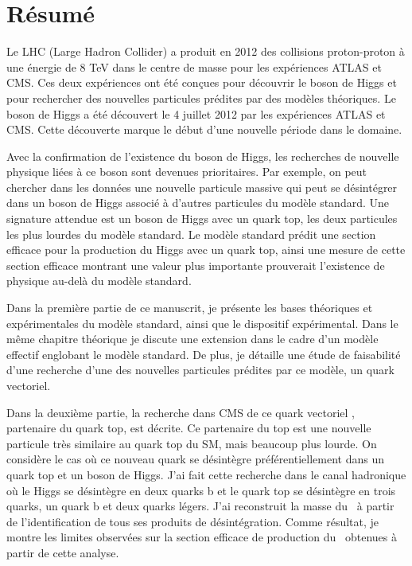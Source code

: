 \begin{otherlanguage}{francais}
\chapter*{R\'{e}sum\'{e}}

Le LHC (Large Hadron Collider) a produit en 2012 des collisions proton-proton à une énergie de 8 TeV  dans le centre de masse pour les expériences ATLAS et CMS. Ces deux expériences ont été conçues pour découvrir le boson de Higgs et pour rechercher des nouvelles particules prédites par des modèles théoriques. Le boson de Higgs a été découvert le 4 juillet 2012 par les expériences ATLAS et CMS. Cette découverte marque le début  d'une nouvelle période dans le domaine. 

Avec la confirmation de l'existence du boson de Higgs, les recherches de nouvelle physique liées à ce boson sont devenues prioritaires. Par exemple, on peut chercher dans les données une nouvelle particule massive qui peut se désintégrer dans un boson de Higgs associé à d'autres particules du modèle standard. Une signature attendue est un boson de Higgs avec un quark top, les deux particules les plus lourdes du modèle standard. Le modèle standard prédit une section efficace pour la production du Higgs avec un quark top, ainsi une mesure de cette section efficace montrant une valeur plus importante prouverait l'existence de physique au-delà du modèle standard.

Dans la première partie de ce manuscrit, je présente les bases théoriques et expérimentales du modèle standard, ainsi que le dispositif expérimental. Dans le même chapitre théorique je discute une extension dans le cadre d'un modèle effectif englobant le modèle standard. De plus, je détaille une étude de faisabilité d'une recherche d'une des nouvelles particules prédites par ce modèle, un quark vectoriel.

Dans la deuxième partie, la recherche dans CMS de ce quark vectoriel \Tp,  partenaire du quark top, est décrite. Ce partenaire du top est une nouvelle particule très similaire au quark top du SM, mais beaucoup plus lourde. On considère le cas où ce nouveau quark se désintègre préférentiellement dans un quark top et un boson de Higgs. J'ai fait cette recherche dans le canal hadronique où le Higgs se désintègre en deux quarks b et le quark top se désintègre en trois quarks, un quark b et deux quarks légers. J'ai reconstruit la masse du \Tp~à partir de l'identification de tous ses produits de désintégration. Comme résultat, je montre les limites observées sur la section efficace de production du \Tp~obtenues à partir de cette analyse.
\end{otherlanguage}  

\endgroup